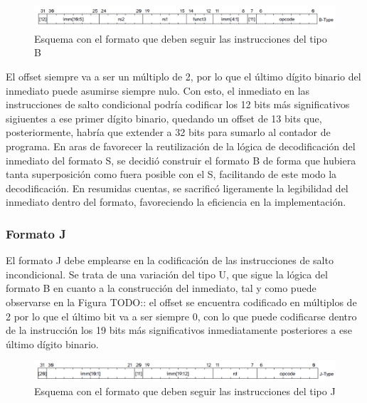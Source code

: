\vspace{+0.3cm}
\begin{figure}[h]
  \centering
  \includegraphics[width=0.95 \linewidth]{res/img/formato-b.png}
  \caption{Esquema con el formato que deben seguir las instrucciones del tipo B}
\end{figure}

El offset siempre va a ser un múltiplo de 2, por lo que el último dígito binario del inmediato puede asumirse siempre nulo. Con esto, el inmediato en las instrucciones de salto condicional podría codificar los 12 bits más significativos sigiuentes a ese primer dígito binario, quedando un offset de 13 bits que, posteriormente, habría que extender a 32 bits para sumarlo al contador de programa. En aras de favorecer la reutilización de la lógica de decodificación del inmediato del formato S, se decidió construir el formato B de forma que hubiera tanta superposición como fuera posible con el S, facilitando de este modo la decodificación. En resumidas cuentas, se sacrificó ligeramente la legibilidad del inmediato dentro del formato, favoreciendo la eficiencia en la implementación.

\subsubsection{Formato J}

El formato J debe emplearse en la codificación de las instrucciones de salto incondicional. Se trata de una variación del tipo U, que sigue la lógica del formato B en cuanto a la construcción del inmediato, tal y como puede observarse en la Figura TODO:: el offset se encuentra codificado en múltiplos de 2 por lo que el último bit va a ser siempre 0, con lo que puede codificarse dentro de la instrucción los 19 bits más significativos inmediatamente posteriores a ese último dígito binario.

\vspace{+0.3cm}
\begin{figure}[h]
  \centering
  \includegraphics[width=0.95 \linewidth]{res/img/formato-j.png}
  \caption{Esquema con el formato que deben seguir las instrucciones del tipo J}
\end{figure}